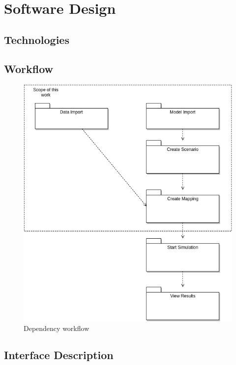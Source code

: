 \chapter{Software Design}



\section{Technologies}


\section{Workflow}
\begin{figure}[H]
	\centering\includegraphics[width=.75\textwidth]{res/Dependency-workflow}
	\caption{Dependency workflow}
	\label{fig:dependency-workflow}
\end{figure}


\section{Interface Description}
